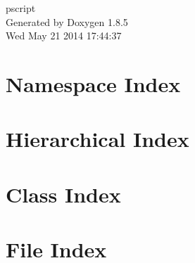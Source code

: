\documentclass[twoside]{book}
\newcommand{\clearemptydoublepage}{%
  \newpage{\pagestyle{empty}\cleardoublepage}%
}
\begin{document}
\hypersetup{pageanchor=false}
\begin{titlepage}
\vspace*{7cm}
\begin{center}%
{\Large pscript }\\
\vspace*{1cm}
{\large Generated by Doxygen 1.8.5}\\
\vspace*{0.5cm}
{\small Wed May 21 2014 17:44:37}\\
\end{center}
\end{titlepage}
\clearemptydoublepage
\tableofcontents
\clearemptydoublepage
{}
\hypersetup{pageanchor=true}

\chapter{Namespace Index}

\chapter{Hierarchical Index}

\chapter{Class Index}

\chapter{File Index}

\end{document}
